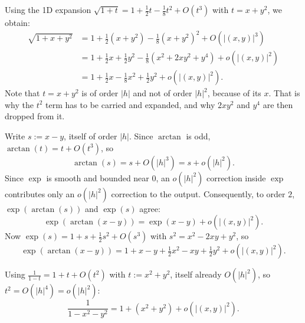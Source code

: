 \begin{exercisesolution}
\label{sol:taylor_expansion_sqrt_1_plus_x_plus_y2}
Using the 1D expansion $\sqrt{1+t} = 1 + \frac{1}{2}t - \frac{1}{8}t^2 + O(t^3)$ with $t = x+y^2$, we obtain:
\begin{align*}
\sqrt{1+x+y^2} &= 1 + \frac{1}{2}(x+y^2) - \frac{1}{8}(x+y^2)^2 + O(|(x,y)|^3) \\
&= 1 + \frac{1}{2}x + \frac{1}{2}y^2 - \frac{1}{8}(x^2+2xy^2+y^4) + o(|(x,y)|^2) \\
&= 1 + \frac{1}{2}x - \frac{1}{8}x^2 + \frac{1}{2}y^2 + o(|(x,y)|^2).
\end{align*}
Note that $t = x+y^2$ is of order $|h|$ and not of order $|h|^2$, because of its $x$. That is why
the $t^2$ term has to be carried and expanded, and why $2xy^2$ and $y^4$ are then dropped from it.
\end{exercisesolution}

\begin{exercisesolution}
\label{sol:taylor_expansion_exp_arctan}
Write $s := x-y$, itself of order $|h|$. Since $\arctan$ is odd, $\arctan(t) = t + O(t^3)$, so
\[\arctan(s) = s + O(|h|^3) = s + o(|h|^2).\]
Since $\exp$ is smooth and bounded near $0$, an $o(|h|^2)$ correction inside $\exp$ contributes
only an $o(|h|^2)$ correction to the output. Consequently, to order $2$, $\exp(\arctan(s))$ and
$\exp(s)$ agree:
\[\exp(\arctan(x-y)) = \exp(x-y) + o(|(x,y)|^2).\]
Now $\exp(s) = 1+s+\tfrac12s^2+O(s^3)$ with $s^2 = x^2-2xy+y^2$, so
\[\exp(\arctan(x-y)) = 1 + x - y + \tfrac12x^2 - xy + \tfrac12y^2 + o(|(x,y)|^2).\]
\end{exercisesolution}

\begin{exercisesolution}
\label{sol:taylor_expansion_one_over_1_minus_x2_y2}
Using $\tfrac{1}{1-t} = 1+t+O(t^2)$ with $t := x^2+y^2$, itself already $O(|h|^2)$, so
$t^2 = O(|h|^4) = o(|h|^2)$:
\[\frac{1}{1-x^2-y^2} = 1 + (x^2+y^2) + o(|(x,y)|^2).\]
\end{exercisesolution}

